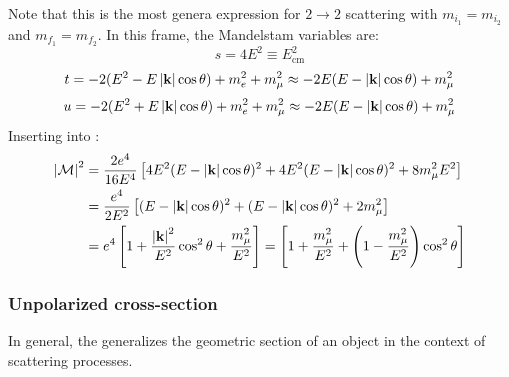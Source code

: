 Note that this is the most genera expression for $ 2 \rightarrow 2 $ scattering with $ m_{i_1} = m_{i_2} $ and $ m_{f_1} = m_{f_2} $. In this frame, the Mandelstam variables are:
\begin{equation*}
  s = 4E^2 \equiv E_\text{cm}^2
\end{equation*}
\begin{equation*}
  t = -2 (E^2 - E \left\lvert\mathbf{k}\right\rvert \cos \theta) + m_e^2 + m_\mu^2 \approx -2E (E - \left\lvert\mathbf{k}\right\rvert \cos \theta) + m_\mu^2
\end{equation*}
\begin{equation*}
  u = -2 (E^2 + E \left\lvert\mathbf{k}\right\rvert \cos \theta) + m_e^2 + m_\mu^2 \approx -2E (E - \left\lvert\mathbf{k}\right\rvert \cos \theta) + m_\mu^2
\end{equation*}
Inserting into :
\begin{equation*}
  \begin{split}
    \left\lvert\mathcal{M}\right\rvert^2
    & = \frac{2e^4}{16 E^4} \left[ 4E^2 (E - \left\lvert\mathbf{k}\right\rvert \cos \theta)^2 + 4E^2 (E - \left\lvert\mathbf{k}\right\rvert \cos \theta)^2 + 8 m_\mu^2 E^2 \right] \\
    & = \frac{e^4}{2E^2} \left[ (E - \left\lvert\mathbf{k}\right\rvert \cos \theta)^2 + (E - \left\lvert\mathbf{k}\right\rvert \cos \theta)^2 + 2m_\mu^2 \right] \\
    & = e^4 \left[ 1 + \frac{\left\lvert\mathbf{k}\right\rvert^2}{E^2} \cos^2 \theta + \frac{m_\mu^2}{E^2} \right] = \left[ 1 + \frac{m_\mu^2}{E^2} + \left( 1 - \frac{m_\mu^2}{E^2} \right) \cos^2 \theta \right]
  \end{split}
\end{equation*}

\subsubsection{Unpolarized cross-section}

In general, the  generalizes the geometric section of an object in the context of scattering processes.










